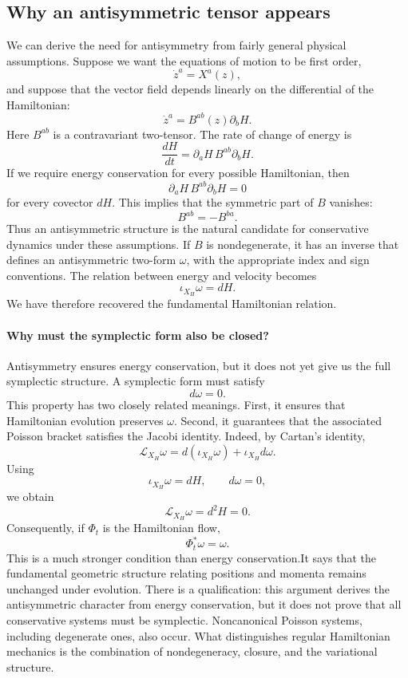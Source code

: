 \subsection{ Why an antisymmetric tensor appears}
We can derive the need for antisymmetry from fairly general physical
assumptions.
Suppose we want the equations of motion to be first order,
\[
\dot z^a=X^a(z),
\]
and suppose that the vector field depends linearly on the differential of the
Hamiltonian:
\[
\boxed{\dot z^a=B^{ab}(z)\partial_bH.}
\]
Here \(B^{ab}\) is a contravariant two-tensor.
The rate of change of energy is
\[
\frac{dH}{dt}
=\partial_aH\,B^{ab}\partial_bH.
\]
If we require energy conservation for every possible Hamiltonian, then
\[
\partial_aH\,B^{ab}\partial_bH=0
\]
for every covector \(dH\).
This implies that the symmetric part of \(B\) vanishes:
\[
\boxed{B^{ab}=-B^{ba}.}
\]
Thus an antisymmetric structure is the natural candidate for conservative
dynamics under these assumptions.
If \(B\) is nondegenerate, it has an inverse that defines an antisymmetric
two-form \(\omega\), with the appropriate index and sign conventions.
The relation between energy and velocity becomes
\[
\boxed{\iota_{X_H}\omega=dH.}
\]
We have therefore recovered the fundamental Hamiltonian relation.

\paragraph{Why must the symplectic form also be closed?}
Antisymmetry ensures energy conservation, but it does not yet give us the full
symplectic structure.
A symplectic form must satisfy
\[
\boxed{d\omega=0.}
\]
This property has two closely related meanings.
First, it ensures that Hamiltonian evolution preserves \(\omega\). Second, it
guarantees that the associated Poisson bracket satisfies the Jacobi identity.
Indeed, by Cartan's identity,
\[
\mathcal L_{X_H}\omega
=d(\iota_{X_H}\omega)+\iota_{X_H}d\omega.
\]
Using
\[
\iota_{X_H}\omega=dH,\qquad d\omega=0,
\]
we obtain
\[
\boxed{
\mathcal L_{X_H}\omega=d^2H=0.
}
\]
Consequently, if \(\Phi_t\) is the Hamiltonian flow,
\[
\boxed{\Phi_t^*\omega=\omega.}
\]
This is a much stronger condition than energy conservation.It says that the
fundamental geometric structure relating positions and momenta remains
unchanged under evolution. There is a qualification: this argument derives the
antisymmetric character from energy conservation, but it does not prove that
all conservative systems must be symplectic. Noncanonical Poisson systems,
including degenerate ones, also occur. What distinguishes regular Hamiltonian
mechanics is the combination of nondegeneracy, closure, and the variational
structure.
